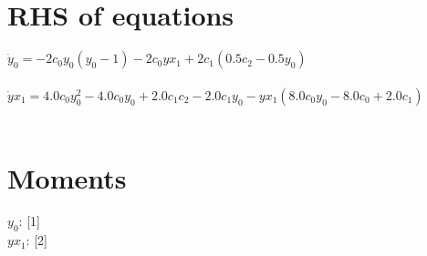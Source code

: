 \documentclass{article}
\begin{document}
\section*{RHS of equations}
$\dot y_{0} = - 2 c_{0} y_{0} \left(y_{0} -1\right) - 2 c_{0} yx_{1} + 2 c_{1} \left(0.5 c_{2} - 0.5 y_{0}\right)$\\\\$\dot yx_{1} = 4.0 c_{0} y_{0}^{2} - 4.0 c_{0} y_{0} + 2.0 c_{1} c_{2} - 2.0 c_{1} y_{0} - yx_{1} \left(8.0 c_{0} y_{0} - 8.0 c_{0} + 2.0 c_{1}\right)$\\\\
\section*{Moments}

$y_{0}$: {[1]}\\
$yx_{1}$: {[2]}\\
\end{document}
